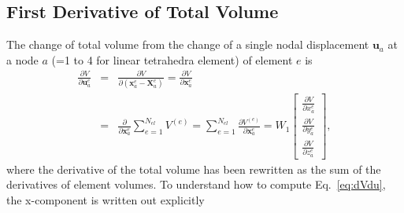 \subsection{First Derivative of Total Volume}

The change of total volume from the change of a single nodal displacement $\pmb{u}_a$ at a node $a$ (=1 to 4 for linear tetrahedra element) of element $e$ is
%
\begin{eqnarray}
\frac{\partial V}{\partial \pmb{u}_a^e} &=& \frac{\partial V}{\partial (\pmb{x}_a^e-\pmb{X}_a^e)} = \frac{\partial V}{\partial \pmb{x}_a^e} \nonumber\\
&=& \frac{\partial}{\partial \pmb{x}_a^e} \sum_{e=1}^{N_{el}}V^{(e)} = \sum_{e=1}^{N_{el}}\frac{\partial V^{(e)}}{\partial \pmb{x}_a^e}
= W_1\begin{bmatrix}
\frac{\partial V}{\partial x_a^e} \\ \frac{\partial V}{\partial y_a^e} \\ \frac{\partial V}{\partial z_a^e}
\end{bmatrix},
\label{eq:dVdu}
\end{eqnarray}
%
where the derivative of the total volume has been rewritten as the sum of the derivatives of element volumes. To understand how to compute Eq.\ \eqref{eq:dVdu}, the x-component is written out explicitly
%

